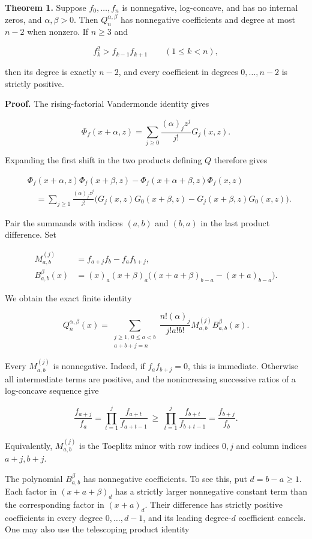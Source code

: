 \documentclass[11pt]{article}
\begin{document}
\textbf{Theorem 1.} Suppose \(f_0,\ldots,f_n\) is nonnegative,
log-concave, and has no internal zeros, and \(\alpha,\beta>0\). Then
\(Q_n^{\alpha,\beta}\) has nonnegative coefficients and degree at most
\(n-2\) when nonzero. If \(n\ge3\) and

\[
f_k^2>f_{k-1}f_{k+1}\qquad(1\le k<n),
\tag{3}
\]

then its degree is exactly \(n-2\), and every coefficient in degrees
\(0,\ldots,n-2\) is strictly positive.

\textbf{Proof.} The rising-factorial Vandermonde identity gives

\[
\Phi_f(x+\alpha,z)=\sum_{j\ge0}\frac{(\alpha)_jz^j}{j!}G_j(x,z).
\]

Expanding the first shift in the two products defining \(Q\) therefore
gives

\[
\begin{aligned}
&\Phi_f(x+\alpha,z)\Phi_f(x+\beta,z)
-\Phi_f(x+\alpha+\beta,z)\Phi_f(x,z)\\
&\quad=\sum_{j\ge1}\frac{(\alpha)_jz^j}{j!}
\bigl(G_j(x,z)G_0(x+\beta,z)
-G_j(x+\beta,z)G_0(x,z)\bigr).
\end{aligned}
\]

Pair the summands with indices \((a,b)\) and \((b,a)\) in the last
product difference. Set

\[
\begin{aligned}
M_{a,b}^{(j)}&=f_{a+j}f_b-f_af_{b+j},\\
B_{a,b}^{\beta}(x)&=(x)_a(x+\beta)_a
\bigl((x+a+\beta)_{b-a}-(x+a)_{b-a}\bigr).
\end{aligned}
\]

We obtain the exact finite identity

\[
Q_n^{\alpha,\beta}(x)=
\sum_{\substack{j\ge1,\ 0\le a<b\\a+b+j=n}}
\frac{n!(\alpha)_j}{j!a!b!}
M_{a,b}^{(j)}B_{a,b}^{\beta}(x).
\tag{4}
\]

Every \(M_{a,b}^{(j)}\) is nonnegative. Indeed, if \(f_af_{b+j}=0\),
this is immediate. Otherwise all intermediate terms are positive, and
the nonincreasing successive ratios of a log-concave sequence give

\[
\frac{f_{a+j}}{f_a}
=\prod_{t=1}^j\frac{f_{a+t}}{f_{a+t-1}}
\ \ge\ \prod_{t=1}^j\frac{f_{b+t}}{f_{b+t-1}}
=\frac{f_{b+j}}{f_b}.
\]

Equivalently, \(M_{a,b}^{(j)}\) is the Toeplitz minor with row indices
\(0,j\) and column indices \(a+j,b+j\).

The polynomial \(B_{a,b}^{\beta}\) has nonnegative coefficients. To see
this, put \(d=b-a\ge1\). Each factor in \((x+a+\beta)_d\) has a strictly
larger nonnegative constant term than the corresponding factor in
\((x+a)_d\). Their difference has strictly positive coefficients in
every degree \(0,\ldots,d-1\), and its leading degree-\(d\) coefficient
cancels. One may also use the telescoping product identity
\end{document}
